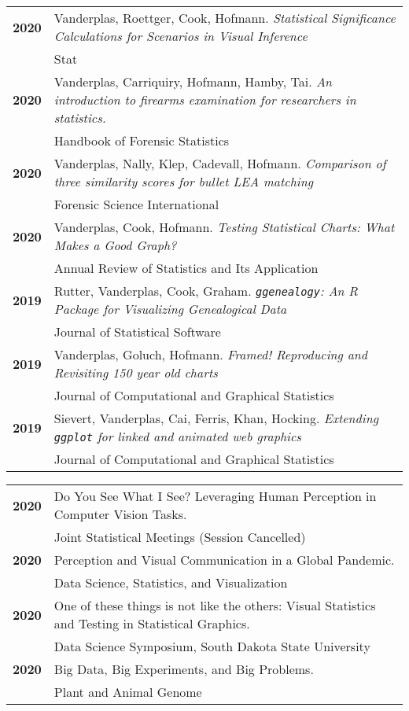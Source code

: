 
\newcommand{\Paper}[4]{
\textbf{\textcolor{materialPurple}{\large #1}} & {\normalsize  #2. \emph{#3}}\\
& {\normalsize \textcolor{textLightGray}{#4}}\vspace{5pt}\\
}
\newcommand{\Presentation}[3]{
\textbf{\textcolor{materialPurpleDark}{\large #1}} &
{\normalsize  #2.} %
\\&{\normalsize \textcolor{textLightGray}{#3}} \vspace{5pt}\\%
}


\begin{tabularx}{.95\textwidth}{l X}
\Paper{2020}{Vanderplas, Roettger, Cook, Hofmann}{Statistical Significance Calculations for Scenarios in Visual Inference}{Stat}
\Paper{2020}{Vanderplas, Carriquiry, Hofmann, Hamby, Tai}{An introduction to firearms examination for researchers in statistics.}{Handbook of Forensic Statistics}
\Paper{2020}{Vanderplas, Nally, Klep, Cadevall, Hofmann}{Comparison of three
similarity scores for bullet LEA matching}{Forensic Science International}
\Paper{2020}{Vanderplas, Cook, Hofmann}{Testing Statistical Charts: What Makes a Good Graph?}{Annual Review of Statistics and Its Application}
\Paper{2019}{Rutter, Vanderplas, Cook, Graham}{\texttt{ggenealogy}: An R Package for Visualizing Genealogical Data}{Journal of Statistical Software}
\Paper{2019}{Vanderplas, Goluch, Hofmann}{Framed! Reproducing and Revisiting 150 year old charts}{Journal of Computational and Graphical Statistics}
\Paper{2019}{Sievert, Vanderplas, Cai, Ferris, Khan, Hocking}{Extending \texttt{ggplot} for linked and animated web graphics}{Journal of Computational and Graphical Statistics}
\end{tabularx}

\vfill


\begin{tabularx}{.95\textwidth}{l X}
\Presentation{2020}{Do You See What I See? Leveraging Human Perception in Computer Vision Tasks}{Joint Statistical Meetings {\small (Session Cancelled)}}
\Presentation{2020}{Perception and Visual Communication in a Global Pandemic}{Data Science, Statistics, and Visualization}
\Presentation{2020}{One of these things is not like the others: Visual Statistics and Testing in Statistical Graphics}{Data Science Symposium, South Dakota State University}
\Presentation{2020}{Big Data, Big Experiments, and Big Problems}{Plant and Animal Genome}
\end{tabularx}
\vfill
